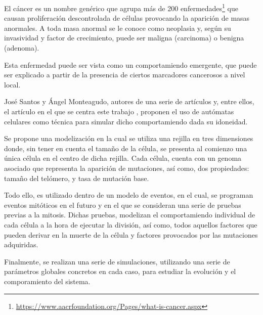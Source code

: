 El cáncer es un nombre genérico que agrupa más de 200 enfermedades\footnote{\url{https://www.aacrfoundation.org/Pages/what-is-cancer.aspx}}
que causan proliferación descontrolada de células provocando la aparición de masas anormales. A toda masa anormal se
le conoce como neoplasia y, según su invasividad y factor de crecimiento, puede ser maligna (carcinoma) o benigna (adenoma).

Esta enfermedad puede ser vista como un comportamiendo emergente, que puede ser explicado a
partir de la presencia de ciertos marcadores cancerosos a nivel local.

José Santos y Ángel Monteagudo, autores de una serie de artículos \cite{jsantos-amonteagudo-2012} \cite{jsantos-amonteagudo-2013} \cite{jsantos-amonteagudo-2015} y, entre ellos, el artículo
en el que se centra este trabajo \cite{jsantos-amonteagudo-1-2014}, proponen el uso de autómatas
celulares como técnica para simular dicho comportamiendo dada su idoneidad.

Se propone una modelización en la cual se utiliza una rejilla en tres dimensiones donde, sin
tener en cuenta el tamaño de la célula, se presenta al comienzo una única célula en el centro de dicha
rejilla. Cada célula, cuenta con un genoma asociado que representa la aparición de mutaciones,
así como, dos propiedades: tamaño del telómero, y tasa de mutación base.

Todo ello, es utilizado dentro de un modelo de eventos, en el cual, se programan eventos mitóticos
en el futuro y en el que se consideran una serie de pruebas previas a la mitosis. Dichas pruebas,
modelizan el comportamiendo individual de cada célula a la hora de ejecutar la división, así como,
todos aquellos factores que pueden derivar en la muerte de la célula y factores provocados
por las mutaciones adquiridas.

Finalmente, se realizan una serie de simulaciones, utilizando una serie de parámetros globales
concretos en cada caso, para estudiar la evolución y el comporamiento del sistema.
